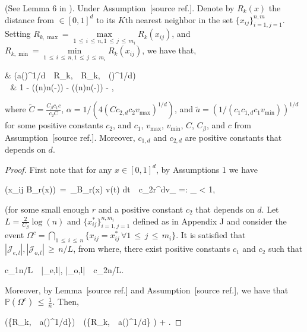 \documentclass[twoside,11pt]{article}
\makeatletter
\newcommand{\discardlabel}[1]{}
\newcommand{\discardtwo}[2]{}
\newcommand{\legacyref}[1]{\textup{[source ref.]}}
\newcommand{\legacyeqref}[1]{\textup{[source equation]}}
\newenvironment{legacycomparison}{%
  \begingroup\color{legacygray}%
  \let\label\discardlabel
  \let\originallabel\discardlabel
  \let\ref\legacyref
  \let\pageref\legacyref
  \let\eqref\legacyeqref
  \let\cref\legacyref
  \let\Cref\legacyref
  \let\autoref\legacyref
  \let\aliasref\discardtwo
}{\endgroup}
\newcommand{\aliasref}[2]{%
  \@ifundefined{r@#2}{}{%
    \expandafter\let\csname r@#1\expandafter\endcsname\csname r@#2\endcsname}}
\makeatother
\begin{document}
\begin{legacycomparison}
\begin{lemma}
\label{Lemma_13} (See Lemma 6 in \cite{madrid2020adaptive}). Under Assumption~\ref{Assumption 1.}. Denote by $R_k(x)$ the distance from $\in [0,1]^d$ to its $K$th nearest neighbor in the set $\{x_{ij}\}_{i=1,j=1}^{n,m}$. Setting $R_{k,\max} = \max\limits_{1 \,\leq\, i \,\leq\, n,1 \,\leq\, j \,\leq\, m_i} R_k(x_{ij})$,
and $R_{k,\min} = \min\limits_{1 \,\leq\, i \,\leq\, n,1 \,\leq\, j \,\leq\, m_i} R_k(x_{ij})$, we have that,
\end{lemma}
\bea 
& \left(a\left(\right)^{1/d} \,\leq\, R_{k,\min} \,\leq\, R_{k,\max} \,\leq\, \left(\right)^{1/d}\right) \\
\,\geq\, & 1 -  \left(\log(n)n\exp\left(-\right)\right) - \left(\log(n)n\exp\left(-\right)\right) - ,
\bea  

where $\tilde{C} = \frac{C_{\beta}c_1 c}{c_2C}$, $\alpha = 1/(4(Cc_{2,d}c_2v_{\max})^{1/d})$, and $\tilde{a} = (1/(c_1c_{1,d}c_1 v_{\min}))^{1/d}$ for some positive constants $c_2$, and $c_1$, $v_{\max}$, $v_{\min}$, $C$, $C_{\beta}$, and $c$ from Assumption~\ref{Assumption 1.}. Moreover, $c_{1,d}$ and $c_{2,d}$ are positive constants that depends on $d$.

\begin{proof} First note that for any $x \in [0,1]^d$, by Assumptions 1 we have

\beq 
\label{eq:272}
\left(x_{ij} \in B_r(x)\right) \,=\, \int_{B_r(x)} v(t) dt \,\leq\, c_2r^dv_{\max} =: \mu_{\max} < 1,
\beq 

(for some small enough $r$ and a positive constant $c_2$ that depends on $d$. Let $L = \frac{2}{C_{\beta}} \log(n)$ and $\{x_{ij}^*\}_{i=1,j=1}^{n,m_i}$ defined as in Appendix J and consider the event $\Omega^c = \bigcap\limits_{1 \,\leq\, i \,\leq\, n}\{x_{ij} = x_{ij}^*\, \forall 1 \,\leq\, j \,\leq\, m_i\}$. It is satisfied that $|\mathcal{J}_{e,l}|, |\mathcal{J}_{o,l}| \,\geq\, n/L$, from where, there exist positive constants $c_1$ and $c_2$ such that

\beq 
\label{eq:273}
c_1n/L \,\leq\, |_{e,l}|, |_{o,l}| \,\leq\, c_2n/L.
\beq 

Moreover, by Lemma~\ref{Lemma_9} and Assumption~\ref{Assumption 1.}, we have that $\mathbb{P}(\Omega^c) \,\leq\, \frac{1}{n}$. Then,

\beq 
\label{eq:274}
\left(\left\{R_{k,\min} \,\leq\, a\left(\right)^{1/d}\right\}\right) \,\leq\, \left(\left\{R_{k,\min} \,\leq\, a\left(\right)^{1/d}\right\} \cap\Omega\right) + .
\beq 


\end{proof}
\end{legacycomparison}
\end{document}
